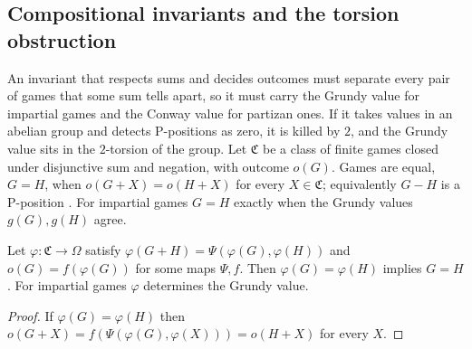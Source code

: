 \subsection{Compositional invariants and the torsion obstruction}\label{ssec:torsion}
An invariant that respects sums and decides outcomes must separate every pair of games that some sum tells apart, so it must carry the Grundy value for impartial games and the Conway value for partizan ones. If it takes values in an abelian group and detects P-positions as zero, it is killed by $2$, and the Grundy value sits in the $2$-torsion of the group. Let $\mathfrak C$ be a class of finite games closed under disjunctive sum and negation, with outcome $o(G)$. Games are equal, $G=H$, when $o(G+X)=o(H+X)$ for every $X\in\mathfrak C$; equivalently $G-H$ is a P-position \cite{Siegel}. For impartial games $G=H$ exactly when the Grundy values $g(G),g(H)$ agree.

\begin{theorem}\label{thm:compositional}
Let $\varphi\colon\mathfrak C\to\Omega$ satisfy $\varphi(G+H)=\Psi(\varphi(G),\varphi(H))$ and $o(G)=f(\varphi(G))$ for some maps $\Psi,f$. Then $\varphi(G)=\varphi(H)$ implies $G=H$. For impartial games $\varphi$ determines the Grundy value.
\end{theorem}
\begin{proof}
If $\varphi(G)=\varphi(H)$ then $o(G+X)=f(\Psi(\varphi(G),\varphi(X)))=o(H+X)$ for every $X$.
\end{proof}

